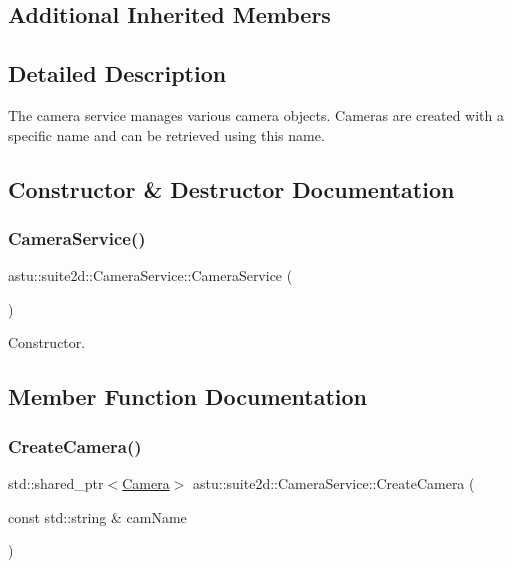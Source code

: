 \subsection*{Additional Inherited Members}


\subsection{Detailed Description}
The camera service manages various camera objects. Cameras are created with a specific name and can be retrieved using this name. 

\subsection{Constructor \& Destructor Documentation}
\mbox{\label{classastu_1_1suite2d_1_1CameraService_a2c77c9b8dbc01ef54797cb4c58569a50}} 
\subsubsection{\texorpdfstring{Camera\+Service()}{CameraService()}}
{\footnotesize\ttfamily astu\+::suite2d\+::\+Camera\+Service\+::\+Camera\+Service (\begin{DoxyParamCaption}{ }\end{DoxyParamCaption})}

Constructor. 

\subsection{Member Function Documentation}
\mbox{\label{classastu_1_1suite2d_1_1CameraService_a6a249aa14317fe758898db2114bd9848}} 
\subsubsection{\texorpdfstring{Create\+Camera()}{CreateCamera()}}
{\footnotesize\ttfamily std\+::shared\+\_\+ptr$<$\hyperlink{classastu_1_1suite2d_1_1Camera}{Camera}$>$ astu\+::suite2d\+::\+Camera\+Service\+::\+Create\+Camera (\begin{DoxyParamCaption}\item[{const std\+::string \&}]{cam\+Name }\end{DoxyParamCaption})}

